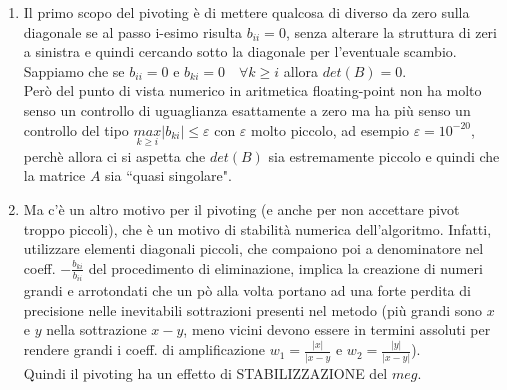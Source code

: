 \documentclass[12pt,a4paper]{article}
\begin{document}
\begin{enumerate}
\item Il primo scopo del pivoting è di mettere qualcosa di diverso da zero sulla diagonale se al passo i-esimo risulta $b_{ii}=0$, senza alterare la struttura di zeri a sinistra e quindi cercando sotto la diagonale per l'eventuale scambio.\\Sappiamo che se $b_{ii}=0$ e $b_{ki}=0\quad \forall k\geq i$ allora $det(B)=0$.\\Però del punto di vista numerico in aritmetica floating-point non ha molto senso un controllo di uguaglianza esattamente a zero ma ha più senso un controllo del tipo $\underset{k\geq i}{max}|b_{ki}|\leq \varepsilon$ con $\varepsilon$ molto piccolo, ad esempio $\varepsilon=10^{-20}$, perchè allora ci si aspetta che $det(B)$ sia estremamente piccolo e quindi che la matrice $A$ sia ``quasi singolare".
\item Ma c'è un altro motivo per il pivoting (e anche per non accettare pivot troppo piccoli), che è un motivo di stabilità numerica dell'algoritmo. Infatti, utilizzare elementi diagonali piccoli, che compaiono poi a denominatore nel coeff. $-\frac{b_{ki}}{b_{ii}}$ del procedimento di eliminazione, implica la creazione di numeri grandi e arrotondati che un pò alla volta portano ad una forte perdita di precisione nelle inevitabili sottrazioni presenti nel metodo (più grandi sono $x$ e $y$ nella sottrazione $x-y$, meno vicini devono essere in termini assoluti per rendere grandi i coeff. di amplificazione $w_1=\frac{|x|}{|x-y}$ e $w_2=\frac{|y|}{|x-y|}$).\\Quindi il pivoting ha un effetto di STABILIZZAZIONE del $meg$.\\\\
\end{enumerate}
\end{document}
